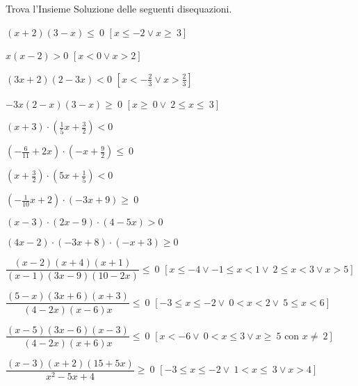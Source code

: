 \newpage

\begin{esercizio}[\Ast]
 \label{ese:21.44}
Trova l'Insieme Soluzione delle seguenti disequazioni.
\begin{multicols}{1}
 \begin{enumeratea}
 \item $(x+2)(3-x)\le~0$ \hfill $\left[x\le -2\vee x\ge~3\right]$
\item $x(x-2)>0$ \hfill $\left[x<0\vee x>2\right]$
\item $(3x+2)(2-3x)<0$ \hfill $\left[x<-{\frac{2}{3}}\vee x>\frac{2}{3}\right]$
\item $-3x(2-x)(3-x)\ge~0$ \hfill $\left[x\ge~0\vee~2\le x\le~3\right]$
\item $(x+3)\cdot \left(\frac{1}{5}x+\frac{3}{2}\right)<0$ 
\item $\left(-{\frac{6}{11}}+2x\right)\cdot\left(-x+\frac{9}{2}\right)\le~0$
\item $\left(x+\frac{3}{2}\right)\cdot \left(5x+\frac{1}{5}\right)<0$
\item $\left(-{\frac{1}{10}}x+2\right)\cdot \left(-3x+9\right)\ge~0$
\item $(x-3)\cdot (2x-9)\cdot (4-5x)>0$
\item $(4x-2)\cdot (-3x+8)\cdot (-x+3)\ge0$
\item $\dfrac{(x-2)(x+4)(x+1)}{(x-1)(3x-9)(10-2x)}\leqslant~0$ 
 \hfill $\left[x\le -4\vee -1\le x<1\vee~2\le x<3\vee x>5\right]$
\item $\dfrac{(5-x)(3x+6)(x+3)}{(4-2x)(x-6)x}\leqslant~0$
 \hfill $\left[-3\le x\le -2\vee~0<x<2\vee~5\le x<6\right]$
\item $\dfrac{(x-5)(3x-6)(x-3)}{(4-2x)(x+6)x}\leqslant~0$
 \hfill $\left[x<-6\vee~0<x\le3\vee x\ge~5\text{ con }x\neq~2\right]$
\item $\dfrac{(x-3)(x+2)(15+5x)}{x^{2}-5x+4}\geqslant~0$
 \hfill $\left[-3\le x\le -2\vee~1<x\le~3\vee x>4\right]$
\end{enumeratea}
\end{multicols}
\end{esercizio}

